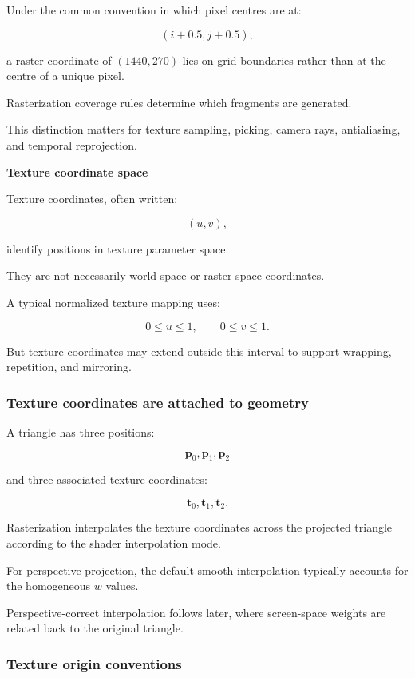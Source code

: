 Under the common convention in which pixel centres are at:

\[
 (i+0.5,j+0.5),
\]

a raster coordinate of \((1440,270)\) lies on grid boundaries rather than at the centre of a unique pixel.

Rasterization coverage rules determine which fragments are generated.

This distinction matters for texture sampling, picking, camera rays, antialiasing, and temporal reprojection.

\textbf{Texture coordinate space}

Texture coordinates, often written:

\[
 (u,v),
\]

identify positions in texture parameter space.

They are not necessarily world-space or raster-space coordinates.

A typical normalized texture mapping uses:

\[
 0\le u\le1,\qquad0\le v\le1.
\]

But texture coordinates may extend outside this interval to support wrapping, repetition, and mirroring.

\subsubsection{Texture coordinates are attached to geometry}\label{02-foundations-ii-ch032-texture-coordinates-are-attached-to-geometry}

A triangle has three positions:

\[
 \mathbf p_0,\mathbf p_1,\mathbf p_2
\]

and three associated texture coordinates:

\[
 \mathbf t_0,\mathbf t_1,\mathbf t_2.
\]

Rasterization interpolates the texture coordinates across the projected triangle according to the shader interpolation mode.

For perspective projection, the default smooth interpolation typically accounts for the homogeneous \(w\) values.

Perspective-correct interpolation follows later, where screen-space weights are related back to the original triangle.

\subsubsection{Texture origin conventions}\label{02-foundations-ii-ch032-texture-origin-conventions}

